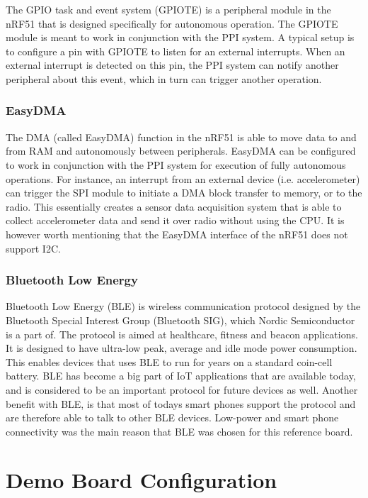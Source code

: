 The GPIO task and event system (GPIOTE) is a peripheral module in the nRF51 that is designed specifically for autonomous operation. The GPIOTE module is meant to work in conjunction with the PPI system. A typical setup is to configure a pin with GPIOTE to listen for an external interrupts. When an external interrupt is detected on this pin, the PPI system can notify another peripheral about this event, which in turn can trigger another operation.

\subsubsection{EasyDMA}

The DMA (called EasyDMA) function in the nRF51 is able to move data to and from RAM and autonomously between peripherals. EasyDMA can be configured to work in conjunction with the PPI system for execution of fully autonomous operations. For instance, an interrupt from an external device (i.e. accelerometer) can trigger the SPI module to initiate a DMA block transfer to memory, or to the radio. This essentially creates a sensor data acquisition system that is able to collect accelerometer data and send it over radio without using the CPU. It is however worth mentioning that the EasyDMA interface of the nRF51 does not support I2C.

\subsubsection{Bluetooth Low Energy}

Bluetooth Low Energy (BLE) is wireless communication protocol designed by the Bluetooth Special Interest Group (Bluetooth SIG), which Nordic Semiconductor is a part of. The protocol is aimed at healthcare, fitness and beacon applications. It is designed to have ultra-low peak, average and idle mode power consumption. This enables devices that uses BLE to run for years on a standard coin-cell battery. BLE has become a big part of IoT applications that are available today, and is considered to be an important protocol for future devices as well. Another benefit with BLE, is that most of todays smart phones support the protocol and are therefore able to talk to other BLE devices. Low-power and smart phone connectivity was the main reason that BLE was chosen for this reference board. 

\section{Demo Board Configuration}

